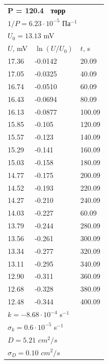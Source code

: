 \documentclass[a4paper,12pt]{article}
\begin{document}
	\newpage
	
	
	\begin{center}
		
		
		\begin{tabular}{||l|l|l||}
			\hline
			
			
			
			
			
			\multicolumn{3}{||l||}{\textbf{P = 120.4  торр}} \\ 
			\multicolumn{3}{||l||}{$1 / P = 6.23 \cdot 10^{-5}$ $Па^{-1}$} \\ \hline
			\multicolumn{3}{||l||}{$U_0 = 13.13$ mV} \\ \hline
			$U$, mV&$\ln (U/U_0)$ & $t$, s \\ \hline
			17.36& -0.0142 &20.09 \\ \hline
			17.05 &  -0.0325 &40.09 \\ \hline
			16.74 & -0.0510&60.09  \\ \hline
			16.43 & -0.0694&80.09  \\ \hline
			16.13 & -0.0877&100.09  \\ \hline
			15.85  & -0.105&120.09  \\ \hline
			15.57 & 	-0.123 &140.09  \\ \hline
			15.29 & -0.141&160.09  \\ \hline
			15.03& -0.158&180.09  \\ \hline
			14.77& -0.175 &200.09  \\ \hline
			14.52& -0.193  &220.09  \\ \hline
			14.27& -0.210 &240.09  \\ \hline
			14.03& -0.227 &60.09  \\ \hline
			13.79& -0.244 &280.09  \\ \hline
			13.56& -0.261  &300.09  \\ \hline
			13.34&-0.277& 320.09  \\ \hline
			13.11& -0.295&340.09  \\ \hline
			12.90&-0.311& 360.09  \\ \hline
			12.68& 	-0.328 &380.09  \\ \hline
			12.48& -0.344&400.09  \\ \hline
			\multicolumn{3}{||l||}{$k = -8.68 \cdot 10^{-4}$ s$^{-1}$} \\ 
			\multicolumn{3}{||l||}{$\sigma_k =0.6 \cdot 10^{-5}$ s$^{-1}$} \\ \hline 
			\multicolumn{3}{||l||}{$D = 5.21$ $cm^2/s$}\\ 
			\multicolumn{3}{||l||}{$\sigma_D =0.10$ $cm^2/s$} \\ \hline 	\end{tabular}\begin{tabular}{||l|l|l||}
			\hline
			

\end{tabular}
\end{center}
\end{document}
